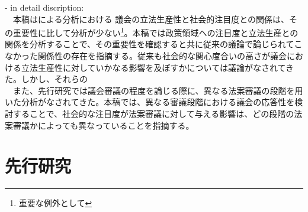 \documentclass[here]{article}
\begin{document}
- in detail discription:
\\
　本稿は\citet*{Adler2013-ay}による分析における
議会の立法生産性と社会的注目度との関係は、その重要性に比して分析が少ない\footnote{重要な例外として\citet*{Adler2013-ay}}。本稿では政策領域への注目度と立法生産との関係を分析することで、その重要性を確認すると共に従来の議論で論じられてこなかった関係性の存在を指摘する。従来も社会的な関心度合いの高さが議会における立法生産性に対していかなる影響を及ぼすかについては議論がなされてきた。しかし、それらの\\
　また、先行研究では議会審議の程度を論じる際に、異なる法案審議の段階を用いた分析がなされてきた。本稿では、異なる審議段階における議会の応答性を検討することで、社会的な注目度が法案審議に対して与える影響は、どの段階の法案審議かによっても異なっていることを指摘する。\\

\section{先行研究}
\end{document}
